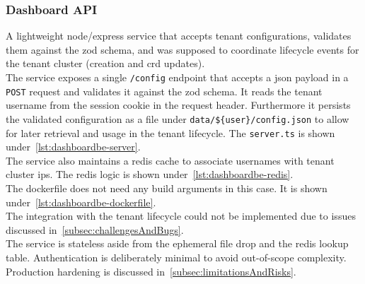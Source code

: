 \documentclass[11pt, a4paper, oneside, listof=totoc]{scrartcl}
\begin{document}
            \subsubsection{Dashboard API}\label{subsubsec:dashboardAPI}
                A lightweight \gls{node}/\gls{express} service that accepts tenant configurations, validates
                them against the zod schema, and was supposed to coordinate lifecycle events for
                the tenant cluster (creation and \gls{crd} updates).\\
                The service exposes a single \texttt{/config} endpoint that accepts a \gls{json}
                payload in a \texttt{POST} request and validates it against the zod schema.
                It reads the tenant username from the session cookie in the request header.
                Furthermore it persists the validated configuration as a file under
                \texttt{data/\$\{user\}/config.json} to allow for later retrieval and usage in the
                tenant lifecycle.
                The \texttt{server.ts} is shown under~\autoref{lst:dashboardbe-server}.\\
                The service also maintains a \gls{redis} cache to associate usernames with tenant cluster
                \glspl{ip}.
                The \gls{redis} logic is shown under~\autoref{lst:dashboardbe-redis}.\\
                The dockerfile does not need any build arguments in this case.
                It is shown under~\autoref{lst:dashboardbe-dockerfile}.\\
                The integration with the tenant lifecycle could not be implemented due to issues
                discussed in~\autoref{subsec:challengesAndBugs}.\\
                The service is stateless aside from the ephemeral file drop and the \gls{redis} lookup
                table.
                Authentication is deliberately minimal to avoid out-of-scope complexity.
                Production hardening is discussed in~\autoref{subsec:limitationsAndRisks}.
\end{document}
